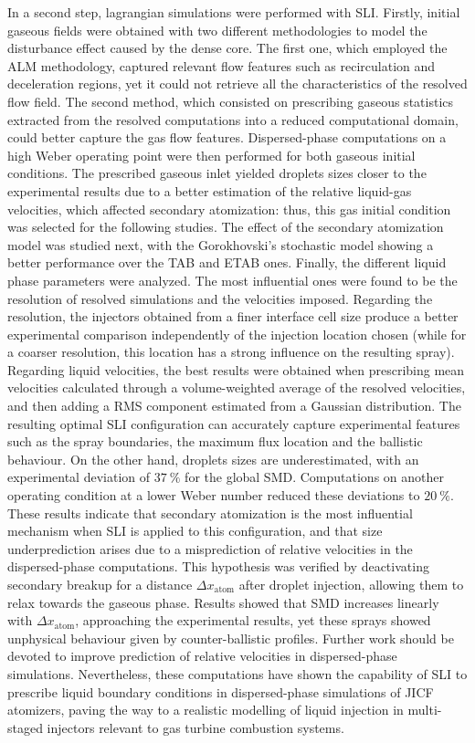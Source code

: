 In a second step, lagrangian simulations were performed with SLI. Firstly, initial gaseous fields were obtained with two different methodologies to model the disturbance effect caused by the dense core. The first one, which employed the ALM methodology, captured relevant flow features such as recirculation and deceleration regions, yet it could not retrieve all the characteristics of the resolved flow field. The second method, which consisted on prescribing gaseous statistics extracted from the resolved computations into a reduced computational domain, could better capture the gas flow features. Dispersed-phase computations on a high Weber operating point were then performed for both gaseous initial conditions. The prescribed gaseous inlet yielded droplets sizes closer to the experimental results due to a better estimation of the relative liquid-gas velocities, which affected secondary atomization: thus, this gas initial condition was selected for the following studies. The effect of the secondary atomization model was studied next, with the Gorokhovski's stochastic model showing a better performance over the TAB and ETAB ones. Finally, the different liquid phase parameters were analyzed. The most influential ones were found to be the resolution of resolved simulations and the velocities imposed. Regarding the resolution, the injectors obtained from a finer interface cell size produce a better experimental comparison independently of the injection location chosen (while for a coarser resolution, this location has a strong influence on the resulting spray). Regarding liquid velocities, the best results were obtained when prescribing mean velocities calculated through a volume-weighted average of the resolved velocities, and then adding a RMS component estimated from a Gaussian distribution. The resulting optimal SLI configuration can accurately capture experimental features such as the spray boundaries, the maximum flux location and the ballistic behaviour. On the other hand, droplets sizes are underestimated, with an experimental deviation of $37~\%$ for the global SMD. Computations on another operating condition at a lower Weber number reduced these deviations to $20~\%$. These results indicate that secondary atomization is the most influential mechanism when SLI is applied to this configuration, and that size underprediction arises due to a misprediction of relative velocities in the dispersed-phase computations. This hypothesis was verified by deactivating secondary breakup for a distance $\Delta x_\mathrm{atom}$ after droplet injection, allowing them to relax towards the gaseous phase. Results showed that SMD increases linearly with $\Delta x_\mathrm{atom}$, approaching the experimental results, yet these sprays showed unphysical behaviour given by counter-ballistic profiles. Further work should be devoted to improve prediction of relative velocities in dispersed-phase simulations. Nevertheless, these computations have shown the capability of SLI to prescribe liquid boundary conditions in dispersed-phase simulations of JICF atomizers, paving the way to a realistic modelling of liquid injection in multi-staged injectors relevant to gas turbine combustion systems.


